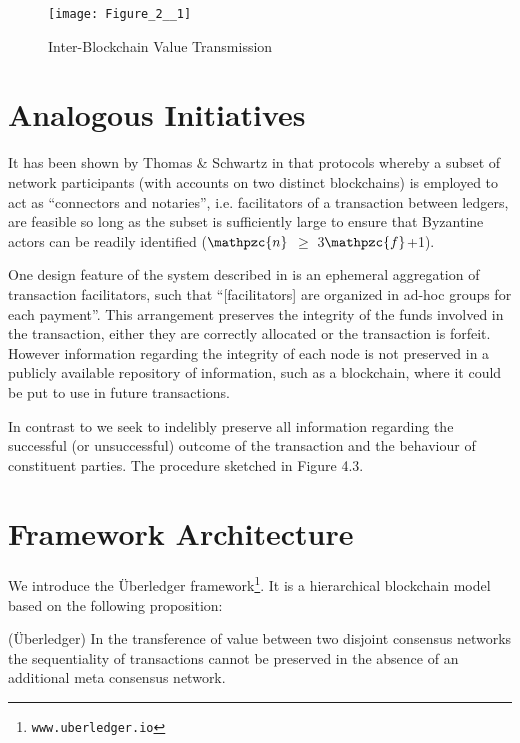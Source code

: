 \begin{figure}
\centering
\texttt{[image: Figure\_2\_\_1]}
\caption{Inter-Blockchain Value Transmission}
\end{figure}

\section{Analogous Initiatives}

It has been shown by Thomas \& Schwartz in \cite{hope2016interledger} that protocols whereby a subset of network participants (with accounts on two distinct blockchains) is employed to act as \enquote{connectors and notaries}, i.e. facilitators of a transaction between ledgers, are feasible so long as the subset is sufficiently large to ensure that Byzantine actors can be readily identified ($\mathpzc{n}$ $\geq$ 3$\mathpzc{f}$+1). 

One design feature of the system described in \cite{hope2016interledger} is an ephemeral aggregation of transaction facilitators, such that \enquote{[facilitators] are organized in ad-hoc groups for each payment}.
This arrangement preserves the integrity of the funds involved in the transaction, either they are correctly allocated or the transaction is forfeit.
However information regarding the integrity of each node is not preserved in a publicly available repository of information, such as a blockchain, where it could be put to use in future transactions.  

In contrast to \cite{hope2016interledger} we seek to indelibly preserve all information regarding the successful (or unsuccessful) outcome of the transaction and the behaviour of constituent parties. 
The procedure sketched in Figure 4.3.


\section{Framework Architecture}

We introduce the \"{U}berledger framework\footnote{ \texttt{www.uberledger.io}}. 
It is a hierarchical blockchain model based on the following proposition:  

\theoremstyle{definition}
\begin{definition}{(\"{U}berledger)}
In the transference of value between two disjoint consensus networks the sequentiality of transactions cannot be preserved in the absence of an additional meta consensus network.
\end{definition}

